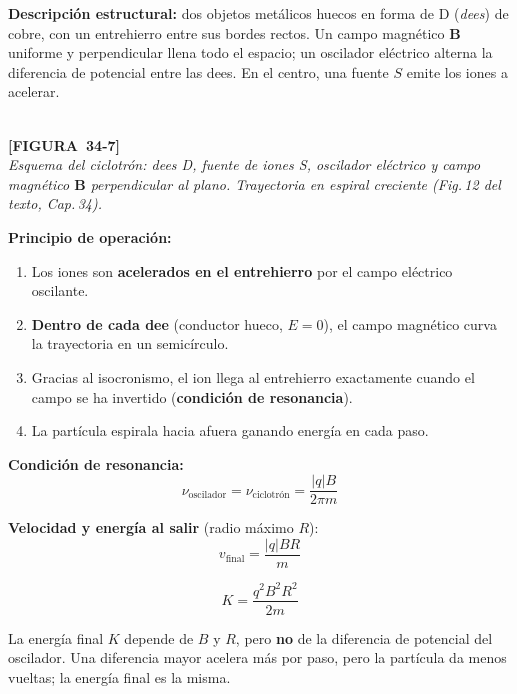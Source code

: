 \documentclass[12pt, letterpaper]{report}
\numberwithin{equation}{section}
\newcommand{\vB}[1]{\boldsymbol{#1}}          %
\newcommand{\figplaceholder}[2]{%
  \begin{tcolorbox}[figbox]
    \centering
    \textcolor{NavyBlue!50}{\rule{0pt}{2.8cm}}\\[4pt]
    {\small\color{NavyBlue}\textbf{[FIGURA\ #1]}\\[2pt]
    \textit{#2}}
  \end{tcolorbox}
}
\begin{document}
\textbf{Descripción estructural:} dos objetos metálicos huecos en forma de
D (\textit{dees}) de cobre, con un entrehierro entre sus bordes rectos.
Un campo magnético $\vB{B}$ uniforme y perpendicular llena todo el espacio;
un oscilador eléctrico alterna la diferencia de potencial entre las dees.
En el centro, una fuente $S$ emite los iones a acelerar.

\figplaceholder{34-7}{Esquema del ciclotrón: dees D, fuente de iones S,
oscilador eléctrico y campo magnético $\vB{B}$ perpendicular al plano.
Trayectoria en espiral creciente (Fig.\,12 del texto, Cap.\,34).}

\textbf{Principio de operación:}
\begin{enumerate}[leftmargin=2.2em, itemsep=4pt]
  \item Los iones son \textbf{acelerados en el entrehierro} por el campo
        eléctrico oscilante.
  \item \textbf{Dentro de cada dee} (conductor hueco, $E=0$), el campo
        magnético curva la trayectoria en un semicírculo.
  \item Gracias al isocronismo, el ion llega al entrehierro exactamente
        cuando el campo se ha invertido (\textbf{condición de resonancia}).
  \item La partícula espirala hacia afuera ganando energía en cada paso.
\end{enumerate}

\textbf{Condición de resonancia:}
\begin{equation}
  \nu_\text{oscilador} = \nu_\text{ciclotrón} = \frac{|q|B}{2\pi m}
  \label{eq:resonancia}
\end{equation}

\textbf{Velocidad y energía al salir} (radio máximo $R$):
\begin{equation}
  \boxed{v_\text{final} = \frac{|q|BR}{m}}
  \label{eq:vfinal}
\end{equation}

\begin{equation}
  \boxed{K = \frac{q^2B^2R^2}{2m}}
  \label{eq:Kfinal}
\end{equation}

\begin{tcolorbox}[notebox, title=Observación sorprendente]
  La energía final $K$ depende de $B$ y $R$, pero \textbf{no} de la
  diferencia de potencial del oscilador. Una diferencia mayor acelera
  más por paso, pero la partícula da menos vueltas; la energía final
  es la misma.
\end{tcolorbox}
\end{document}
